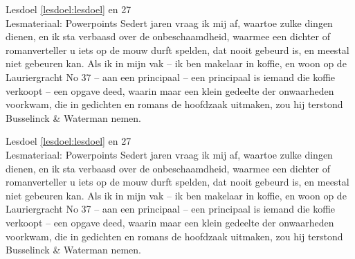 \begin{lesdeel}{
    Lesdoel \ref{lesdoel:lesdoel}  en 27 \\
    Lesmateriaal: Powerpoints
}
    Sedert jaren vraag ik mij af, waartoe zulke dingen dienen, en ik sta verbaasd over de onbeschaamdheid, waarmee een dichter of romanverteller u iets op de mouw durft spelden, dat nooit gebeurd is, en meestal niet gebeuren kan.
    Als ik in mijn vak -- ik ben makelaar in koffie, en woon op de Lauriergracht No 37 -- aan een principaal -- een principaal is iemand die koffie verkoopt -- een opgave deed, waarin maar een klein gedeelte der onwaarheden voorkwam, die in gedichten en romans de hoofdzaak uitmaken, zou hij terstond Busselinck \& Waterman nemen.
\end{lesdeel}%
\begin{lesdeel}{
    Lesdoel \ref{lesdoel:lesdoel}  en 27 \\
    Lesmateriaal: Powerpoints
}
    Sedert jaren vraag ik mij af, waartoe zulke dingen dienen, en ik sta verbaasd over de onbeschaamdheid, waarmee een dichter of romanverteller u iets op de mouw durft spelden, dat nooit gebeurd is, en meestal niet gebeuren kan.
    Als ik in mijn vak -- ik ben makelaar in koffie, en woon op de Lauriergracht No 37 -- aan een principaal -- een principaal is iemand die koffie verkoopt -- een opgave deed, waarin maar een klein gedeelte der onwaarheden voorkwam, die in gedichten en romans de hoofdzaak uitmaken, zou hij terstond Busselinck \& Waterman nemen.
\end{lesdeel}%